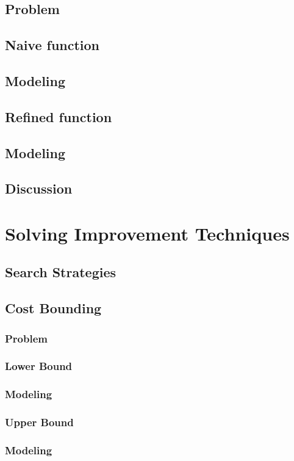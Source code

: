 \subsection{Problem}
\subsection{Naive function}
\subsection{Modeling}
\subsection{Refined function}
\subsection{Modeling}
\subsection{Discussion}

\section{Solving Improvement Techniques}

\subsection{Search Strategies}

\subsection{Cost Bounding}
\subsubsection{Problem}
\subsubsection{Lower Bound}
\subsubsection{Modeling}
\subsubsection{Upper Bound}
\subsubsection{Modeling}

